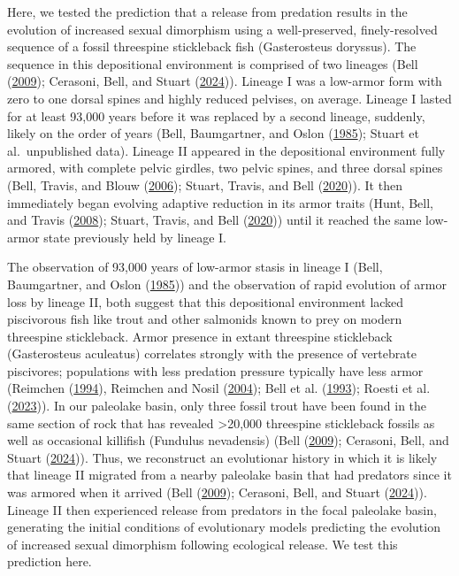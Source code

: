 \documentclass[
  12pt,
]{article}
\begin{document}
Here, we tested the prediction that a release from predation results in
the evolution of increased sexual dimorphism using a well-preserved,
finely-resolved sequence of a fossil threespine stickleback fish
(Gasterosteus doryssus). The sequence in this depositional environment
is comprised of two lineages (Bell
(\protect\hyperlink{ref-Bell2009}{2009}); Cerasoni, Bell, and Stuart
(\protect\hyperlink{ref-Cerasonietal2024}{2024})). Lineage I was a
low-armor form with zero to one dorsal spines and highly reduced
pelvises, on average. Lineage I lasted for at least 93,000 years before
it was replaced by a second lineage, suddenly, likely on the order of
years (Bell, Baumgartner, and Oslon
(\protect\hyperlink{ref-Belletal1985}{1985}); Stuart et al.~unpublished
data). Lineage II appeared in the depositional environment fully
armored, with complete pelvic girdles, two pelvic spines, and three
dorsal spines (Bell, Travis, and Blouw
(\protect\hyperlink{ref-Belletal2006}{2006}); Stuart, Travis, and Bell
(\protect\hyperlink{ref-Stuartetal2020}{2020})). It then immediately
began evolving adaptive reduction in its armor traits (Hunt, Bell, and
Travis (\protect\hyperlink{ref-Huntetal2008}{2008}); Stuart, Travis, and
Bell (\protect\hyperlink{ref-Stuartetal2020}{2020})) until it reached
the same low-armor state previously held by lineage I.

The observation of 93,000 years of low-armor stasis in lineage I (Bell,
Baumgartner, and Oslon (\protect\hyperlink{ref-Belletal1985}{1985})) and
the observation of rapid evolution of armor loss by lineage II, both
suggest that this depositional environment lacked piscivorous fish like
trout and other salmonids known to prey on modern threespine
stickleback. Armor presence in extant threespine stickleback
(Gasterosteus aculeatus) correlates strongly with the presence of
vertebrate piscivores; populations with less predation pressure
typically have less armor (Reimchen
(\protect\hyperlink{ref-Reimchen1994}{1994}), Reimchen and Nosil
(\protect\hyperlink{ref-ReimchenandNosil2004}{2004}); Bell et al.
(\protect\hyperlink{ref-Belletal1993}{1993}); Roesti et al.
(\protect\hyperlink{ref-Roestietal2023}{2023})). In our paleolake basin,
only three fossil trout have been found in the same section of rock that
has revealed \textgreater20,000 threespine stickleback fossils as well
as occasional killifish (Fundulus nevadensis) (Bell
(\protect\hyperlink{ref-Bell2009}{2009}); Cerasoni, Bell, and Stuart
(\protect\hyperlink{ref-Cerasonietal2024}{2024})). Thus, we reconstruct
an evolutionar history in which it is likely that lineage II migrated
from a nearby paleolake basin that had predators since it was armored
when it arrived (Bell (\protect\hyperlink{ref-Bell2009}{2009});
Cerasoni, Bell, and Stuart
(\protect\hyperlink{ref-Cerasonietal2024}{2024})). Lineage II then
experienced release from predators in the focal paleolake basin,
generating the initial conditions of evolutionary models predicting the
evolution of increased sexual dimorphism following ecological release.
We test this prediction here.
\end{document}
